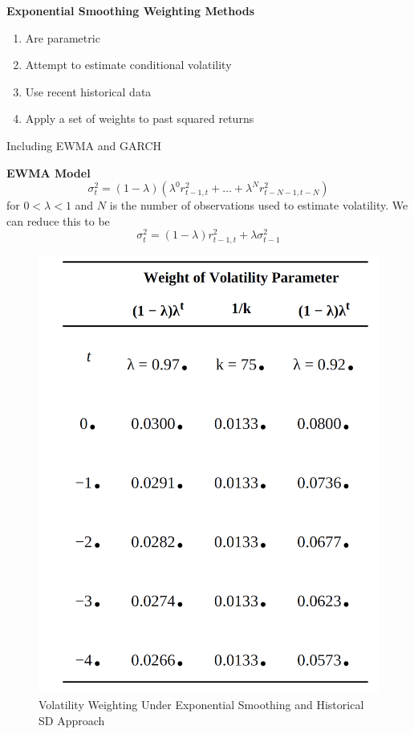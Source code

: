 \documentclass[11pt,fleqn]{book} %
\numberwithin{equation}{section} %
\numberwithin{figure}{section} %
\numberwithin{table}{section} %
\begin{document}
\begin{definition}\textbf{Exponential Smoothing Weighting Methods}
\begin{enumerate}
    \item Are parametric
    \item Attempt to estimate conditional volatility
    \item Use recent historical data
    \item Apply a set of weights to past squared returns
\end{enumerate}
Including EWMA and GARCH
\end{definition}
\begin{theorem}\textbf{EWMA Model}\\ 
$$
\sigma_t^2=(1-\lambda)\left(\lambda^0r_{t-1,t}^2+\dots+\lambda^Nr_{t-N-1,t-N}^2\right)
$$
for $0<\lambda<1$ and $N$ is the number of observations used to estimate volatility. We can reduce this to be
$$
\sigma_t^2=(1-\lambda)r_{t-1,t}^2+\lambda\sigma_{t-1}^2
$$
\end{theorem}
\begin{figure}[h!]
    \centering
    \includegraphics[scale=0.5]{exponential.PNG}
    \caption{Volatility Weighting Under Exponential Smoothing and Historical SD Approach}
\end{figure}
\end{document}

